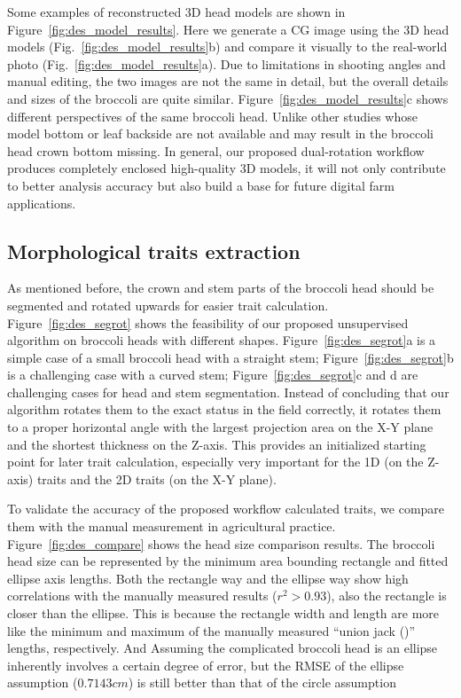 

Some examples of reconstructed 3D head models are shown in Figure~\ref{fig:des_model_results}. Here we generate a CG image using the 3D head models (Fig.~\ref{fig:des_model_results}b) and compare it visually to the real-world photo (Fig.~\ref{fig:des_model_results}a). Due to limitations in shooting angles and manual editing, the two images are not the same in detail, but the overall details and sizes of the broccoli are quite similar. Figure~\ref{fig:des_model_results}c shows different perspectives of the same broccoli head. Unlike other studies whose model bottom \citep{kochi_3d_2018} or leaf backside \citep{cao_quantifying_2019} are not available and may result in the broccoli head crown bottom missing. In general, our proposed dual-rotation workflow produces completely enclosed high-quality 3D models, it will not only contribute to better analysis accuracy but also build a base for future digital farm applications.



\subsection{Morphological traits extraction}

As mentioned before, the crown and stem parts of the broccoli head should be segmented and rotated upwards for easier trait calculation. Figure~\ref{fig:des_segrot} shows the feasibility of our proposed unsupervised algorithm on broccoli heads with different shapes. Figure~\ref{fig:des_segrot}a is a simple case of a small broccoli head with a straight stem; Figure~\ref{fig:des_segrot}b is a challenging case with a curved stem;  Figure~\ref{fig:des_segrot}c and d are challenging cases for head and stem segmentation. Instead of concluding that our algorithm rotates them to the exact status in the field correctly, it rotates them to a proper horizontal angle with the largest projection area on the X-Y plane and the shortest thickness on the Z-axis. This provides an initialized starting point for later trait calculation, especially very important for the 1D (on the Z-axis) traits and the 2D traits (on the X-Y plane).



To validate the accuracy of the proposed workflow calculated traits, we compare them with the manual measurement in agricultural practice. Figure~\ref{fig:des_compare} shows the head size comparison results. The broccoli head size can be represented by the minimum area bounding rectangle and fitted ellipse axis lengths. Both the rectangle way and the ellipse way show high correlations with the manually measured results ($r^2>0.93$), also the rectangle is closer than the ellipse. This is because the rectangle width and length are more like the minimum and maximum of the manually measured ``union jack ()'' lengths, respectively. And Assuming the complicated broccoli head is an ellipse inherently involves a certain degree of error, but the RMSE of the ellipse assumption ($0.7143 cm$) is still better than that of the circle assumption \citep[Table 5, RMSE$=0.97 cm$]{blok_image_2021}

